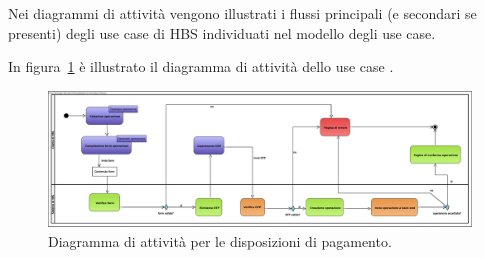 
Nei diagrammi di attività vengono illustrati i flussi principali (e secondari se presenti) degli use case di HBS individuati nel modello degli use case.

In figura~\ref{fig:activity:disposizione-pagamento} è illustrato il diagramma di attività dello use case \iducDISPAG.

\begin{figure}[h]
	\centering
	\includegraphics[width=\textheight, angle=90]{Images/activity/Disposizione_Pagamento.eps}
	\caption{Diagramma di attività per le disposizioni di pagamento.}
	\label{fig:activity:disposizione-pagamento}
\end{figure}
